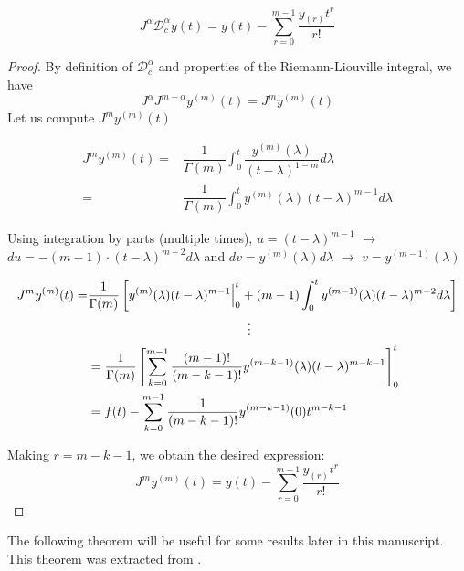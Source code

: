     
    \begin{theorem}\label{theo:rightinverse}
        \begin{equation}
            J^\alpha \mathcal{D}_c^\alpha y(t) = y(t) - \sum_{r=0}^{m-1}\dfrac{y_{(r)}t^r}{r!}
        \end{equation}
    \end{theorem}
        \begin{proof}
        By definition of $\mathcal{D}_c^\alpha$ and properties of the Riemann-Liouville integral, we have\[ J^\alpha J^{m-\alpha}y^{(m)}(t)=J^my^{(m)}(t)\] Let us compute $J^my^{(m)}(t)$
        
        \begin{align*}
            J^my^{(m)}(t)=& \dfrac{1}{\Gamma(m)}\int_0^t \dfrac{y^{(m)}(\lambda)}{(t-\lambda)^{1-m}}d\lambda\\
            =& \dfrac{1}{\Gamma(m)}\int_0^t y^{(m)}(\lambda)(t-\lambda)^{m-1}d\lambda
        \end{align*}
        
        Using integration by parts (multiple times), $u=(t-\lambda)^{m-1}$ $\rightarrow$ $du=-(m-1)\cdot(t-\lambda)^{m-2}d\lambda$ and $dv=y^{(m)}(\lambda)d\lambda$ $\rightarrow$ $v = y^{(m-1)}(\lambda)$
        
        \begin{align*}
            J^my^{(m)}(t)=& \dfrac{1}{\Gamma(m)} \left[ y^{(m)}(\lambda) (t-\lambda)^{m-1}\Big|_0^t + (m-1)\int_0^t y^{(m-1)}(\lambda)(t-\lambda)^{m-2}d\lambda \right]\\
            &\hspace{4.4cm} \vdots\\
            &=\dfrac{1}{\Gamma(m)} \left[\sum_{k=0}^{m-1}\dfrac{(m-1)!}{(m-k-1)!}y^{(m-k-1)}(\lambda)(t-\lambda)^{m-k-1}\right]_0^t\\
            &=f(t)-\sum_{k=0}^{m-1}\dfrac{1}{(m-k-1)!}y^{(m-k-1)}(0)t^{m-k-1}
        \end{align*}
        
        Making $r=m-k-1$, we obtain the desired expression:
        \begin{equation}
            J^my^{(m)}(t)=y(t) - \sum_{r=0}^{m-1}\dfrac{y_{(r)}t^r}{r!}
        \end{equation}
        \end{proof}
        
    The following theorem will be useful for some results later in this manuscript. This theorem was extracted from \cite[p. 135]{diethelm2010analysis}.
        
